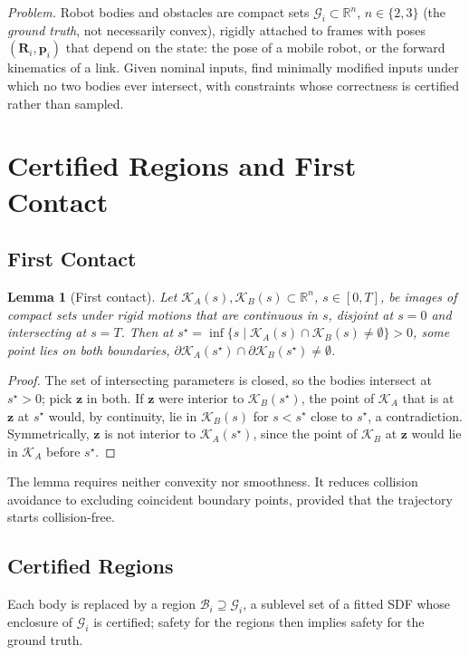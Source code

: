 \documentclass[journal]{IEEEtran}
\newtheorem{lemma}{Lemma}
\theoremstyle{definition}
\newcommand{\R}{\mathbb{R}}
\newcommand{\Rot}{\mathbf{R}}
\begin{document}
\emph{Problem.} Robot bodies and obstacles are compact sets $\mathcal G_i\subset\R^n$, $n\in\{2,3\}$
(the \emph{ground truth}, not necessarily convex), rigidly attached to frames with poses
$(\Rot_i,\mathbf p_i)$ that depend on the state: the pose of a mobile robot, or the forward
kinematics of a link. Given nominal inputs, find minimally modified inputs under which no two
bodies ever intersect, with constraints whose correctness is certified rather than sampled.

\section{Certified Regions and First Contact}\label{sec:regions}

\subsection{First Contact}
\begin{lemma}[First contact]\label{lem:contact}
Let $\mathcal K_A(s),\mathcal K_B(s)\subset\R^n$, $s\in[0,T]$, be images of compact sets under rigid
motions that are continuous in $s$, disjoint at $s=0$ and intersecting at $s=T$. Then at
$s^\star=\inf\{s\mid\mathcal K_A(s)\cap\mathcal K_B(s)\neq\emptyset\}>0$, some point lies on both
boundaries, $\partial\mathcal K_A(s^\star)\cap\partial\mathcal K_B(s^\star)\neq\emptyset$.
\end{lemma}
\begin{proof}
The set of intersecting parameters is closed, so the bodies intersect at $s^\star>0$; pick $\mathbf z$
in both. If $\mathbf z$ were interior to $\mathcal K_B(s^\star)$, the point of $\mathcal K_A$ that
is at $\mathbf z$ at $s^\star$ would, by continuity, lie in $\mathcal K_B(s)$ for $s<s^\star$ close
to $s^\star$, a contradiction. Symmetrically, $\mathbf z$ is not interior to $\mathcal K_A(s^\star)$,
since the point of $\mathcal K_B$ at $\mathbf z$ would lie in $\mathcal K_A$ before $s^\star$.
\end{proof}
The lemma requires neither convexity nor smoothness. It reduces collision avoidance to excluding
coincident boundary points, provided that the trajectory starts collision-free.

\subsection{Certified Regions}\label{sec:cert-body}
Each body is replaced by a region $\mathcal B_i\supseteq\mathcal G_i$, a sublevel set of a fitted SDF
whose enclosure of $\mathcal G_i$ is certified; safety for the regions then implies safety for the
ground truth.
\end{document}

